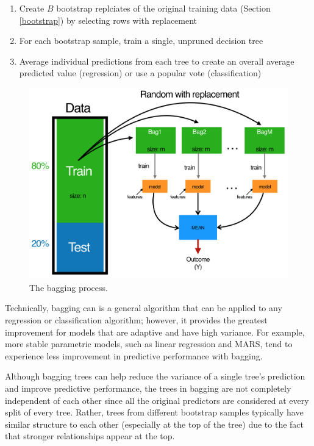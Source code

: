 \documentclass[]{book}
\theoremstyle{definition}
\theoremstyle{definition}
\theoremstyle{definition}
\theoremstyle{remark}
\begin{document}
\begin{enumerate}
\def\labelenumi{\arabic{enumi}.}
\item
  Create \(B\) bootstrap replciates of the original training data
  (Section \ref{bootstrap}) by selecting rows with replacement
\item
  For each bootstrap sample, train a single, unpruned decision tree
\item
  Average individual predictions from each tree to create an overall
  average predicted value (regression) or use a popular vote
  (classification)
\end{enumerate}

\begin{figure}

{\centering \includegraphics[width=0.7\linewidth,height=0.7\textheight]{illustrations/bagging} 

}

\caption{The bagging process.}\label{fig:rf-bagging-image}
\end{figure}

Technically, bagging can is a general algorithm that can be applied to
any regression or classification algorithm; however, it provides the
greatest improvement for models that are adaptive and have high
variance. For example, more stable parametric models, such as linear
regression and MARS, tend to experience less improvement in predictive
performance with bagging.

Although bagging trees can help reduce the variance of a single tree's
prediction and improve predictive performance, the trees in bagging are
not completely independent of each other since all the original
predictors are considered at every split of every tree. Rather, trees
from different bootstrap samples typically have similar structure to
each other (especially at the top of the tree) due to the fact that
stronger relationships appear at the top.
\end{document}
